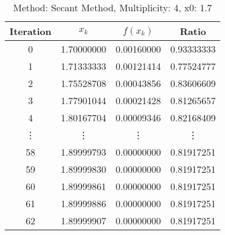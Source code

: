 \begin{table}
\centering
\caption{Method: Secant Method, Multiplicity: 4, x0: 1.7}
\label{tab:table_Secant_Method_4_1_7}
\begin{tabular}{c c c c}
\toprule
Iteration &      $x_k$ &   $f(x_k)$ &      Ratio \\
\midrule
        0 & 1.70000000 & 0.00160000 & 0.93333333 \\
        1 & 1.71333333 & 0.00121414 & 0.77524777 \\
        2 & 1.75528708 & 0.00043856 & 0.83606609 \\
        3 & 1.77901044 & 0.00021428 & 0.81265657 \\
        4 & 1.80167704 & 0.00009346 & 0.82168409 \\
   \vdots &     \vdots &     \vdots &     \vdots \\
       58 & 1.89999793 & 0.00000000 & 0.81917251 \\
       59 & 1.89999830 & 0.00000000 & 0.81917251 \\
       60 & 1.89999861 & 0.00000000 & 0.81917251 \\
       61 & 1.89999886 & 0.00000000 & 0.81917251 \\
       62 & 1.89999907 & 0.00000000 & 0.81917251 \\
\bottomrule
\end{tabular}
\end{table}
